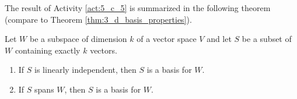 The result of Activity \ref{act:5_c_5} is summarized in the following theorem (compare to Theorem \ref{thm:3_d_basis_properties}).



\begin{theorem} Let $W$ be a subspace of dimension $k$ of a vector space $V$ and let $S$ be a subset of $W$ containing exactly $k$ vectors.
\begin{enumerate}
\item If $S$ is linearly independent, then $S$ is a basis for $W$.
\item If $S$ spans $W$, then $S$ is a basis for $W$.
\end{enumerate}
\end{theorem}


\ExampleIntro

